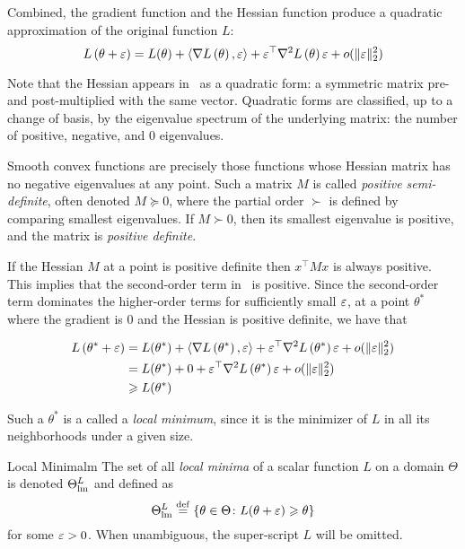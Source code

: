 \documentclass[../../thesis.tex]{subfiles}
\begin{document}
Combined, the gradient function and the Hessian function produce a quadratic approximation
of the original function $L$:
\begin{equation}
	L\left(\theta + \eps\right) =
	L(\theta)
	+ \langle\grad{L}{\theta},\eps\rangle
	+ \eps^\top\hess{L}{\theta}\eps + o(\snormt{\eps})\equationlabel{taylor-two}
\end{equation}

Note that the Hessian appears in~
as a quadratic form:
a symmetric matrix pre- and post-multiplied with the same vector.
Quadratic forms are classified,
up to a change of basis, by the eigenvalue spectrum
of the underlying matrix:
the number of positive, negative, and 0 eigenvalues.

Smooth convex functions are precisely those functions whose
Hessian matrix has no negative eigenvalues at any
point.
Such a matrix $M$ is called \emph{positive semi-definite},
often denoted $M \succeq 0$,
where the partial order $\succ$ is defined by
comparing smallest eigenvalues.
If $M \succ 0$, then its smallest eigenvalue is positive,
and the matrix is \emph{positive definite}.

If the Hessian $M$ at a point is positive definite
then $x^\top M x$ is always positive.
This implies that the second-order term in~
is positive.
Since the second-order term dominates the higher-order terms
for sufficiently small $\varepsilon$,
at a point $\theta^*$ where the gradient is $0$
and the Hessian is positive definite,
we have that

\begin{align}
	L\left(\theta^* + \varepsilon\right) &=
	L(\theta^*)
	+ \langle\nabla L\left(\theta^*\right),\varepsilon\rangle
	+ \varepsilon^\top\nabla^2L\left(\theta^*\right)\varepsilon + o(\lVert\varepsilon\rVert_{\scriptstyle2}^2)\\
	&=
	L(\theta^*)
	+ 0
	+ \varepsilon^\top\nabla^2L\left(\theta^*\right)\varepsilon + o(\lVert\varepsilon\rVert_{\scriptstyle2}^2)\\
	&\geqslant
	L(\theta^*)
\end{align}

Such a $\theta^*$ is a called a \emph{local minimum},
since it is the minimizer of $L$ in all its neighborhoods
under a given size.
\begin{definition}{Local Minima}{lm}
	The set of all \emph{local minima} of a scalar function $L$
	on a domain $\Theta$ is denoted $\Theta^L_{\mathrm{lm}}$ and defined as
	\begin{equation}\equationlabel{def-thetalm}
		\Theta^L_{\lm} \defeq \Set{\theta \in \Theta \suchthat L(\theta + \eps) \geq \theta}
	\end{equation}
	for some $\varepsilon > 0$.
	When unambiguous, the super-script $L$ will be omitted.
\end{definition}
\end{document}
